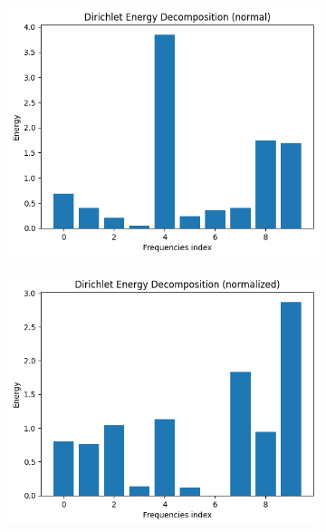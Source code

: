 \documentclass[12pt]{article}
\begin{document}
\begin{figure}[h!]
\centering
\begin{subfigure}{.33\textwidth}
  \centering
  \includegraphics[width=1\linewidth]{images/energy1.png}
\end{subfigure}%
\begin{subfigure}{.33\textwidth}
  \centering
  \includegraphics[width=1\linewidth]{images/energy2.png}
\end{subfigure}%
\begin{subfigure}{.33\textwidth}
  \centering

\end{subfigure}
\end{figure}
\end{document}
